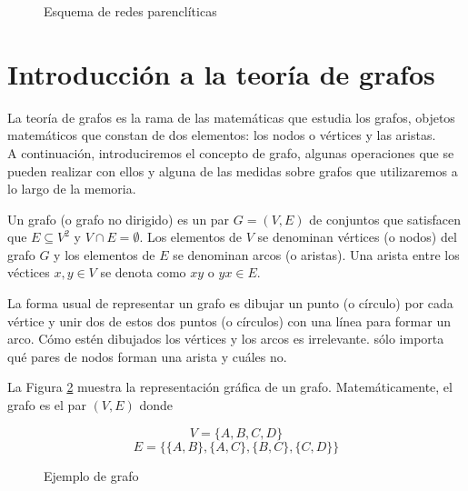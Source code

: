 \begin{figure}[htbp!]
	\label{fig:redesparencliticas}
	\begin{center}
		\resizebox{\textwidth}{!}{%
			\redesparencliticas
		}
	\end{center}
	\caption{Esquema de redes parenclíticas}
\end{figure}

\section{Introducción a la teoría de grafos}

La teoría de grafos es la rama de las matemáticas que estudia los grafos, objetos matemáticos que constan de dos elementos: los nodos o vértices y las aristas.\\

A continuación, introduciremos el concepto de grafo, algunas operaciones que se pueden realizar con ellos y alguna de las medidas sobre grafos que utilizaremos a lo largo de la memoria.\\

\begin{defi}
	Un grafo (o grafo no dirigido) es un par $G = (V,E)$ de conjuntos que satisfacen que $E \subseteq V^2$ y $V \cap E = \emptyset$. Los elementos de $V$ se denominan vértices (o nodos) del grafo $G$ y los elementos de $E$ se denominan arcos (o aristas). Una arista entre los véctices $x, y \in V$ se denota como $xy$ o $yx \in E$.
\end{defi}

La forma usual de representar un grafo es dibujar un punto (o círculo) por cada vértice y unir dos de estos dos puntos (o círculos) con una línea para formar un arco. Cómo estén dibujados los vértices y los arcos es irrelevante. sólo importa qué pares de nodos forman una arista y cuáles no.

\begin{ejemplo}
	
	La Figura \ref{fig:grafo} muestra la representación gráfica de un grafo. Matemáticamente, el grafo es el par $(V, E)$ donde
	
	\[ V = \{A, B, C, D\} \]
	\[ E = \{\{A,B\},\{A,C\},\{B,C\},\{C,D\} \} \]
	
	\begin{figure}[htb]
		\centering
		\ejemplografo
		\caption{Ejemplo de grafo}
		\label{fig:grafo}
	\end{figure}
	
\end{ejemplo}

